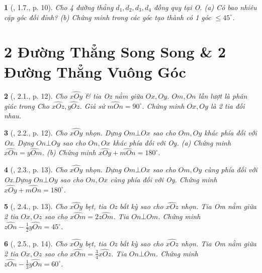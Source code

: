 \documentclass{article}
\newtheorem{baitoan}{}
\begin{document}
\begin{baitoan}[\cite{Hung_Mai_Toan_7_hinh_hoc}, 1.7., p. 10]
	Cho 4 đường thẳng $d_1,d_2,d_3,d_4$ đồng quy tại O. (a) Có bao nhiêu cặp góc đối đỉnh? (b) Chứng minh trong các góc tạo thành có 1 góc $\le45^\circ$.
\end{baitoan}


\section{2 Đường Thẳng Song Song \& 2 Đường Thẳng Vuông Góc}

\begin{baitoan}[\cite{Hung_Mai_Toan_7_hinh_hoc}, 2.1., p. 12]
	Cho $\widehat{xOy}$ \& tia Oz nằm giữa $Ox,Oy$. $Om,On$ lần lượt là phân giác trong Cho $\widehat{xOz},\widehat{yOz}$. Giả sử $\widehat{mOn} = 90^\circ$. Chứng minh $Ox,Oy$ là 2 tia đối nhau.
\end{baitoan}

\begin{baitoan}[\cite{Hung_Mai_Toan_7_hinh_hoc}, 2.2., p. 12]
	Cho $\widehat{xOy}$ nhọn. Dựng $Om\bot Ox$ sao cho $Om,Oy$ khác phía đối với Ox. Dựng $On\bot Oy$ sao cho $On,Ox$ khác phía đối với Oy. (a) Chứng minh $\widehat{xOn} = \widehat{yOm}$. (b) Chứng minh $\widehat{xOy} + \widehat{mOn} = 180^\circ$.
\end{baitoan}

\begin{baitoan}[\cite{Hung_Mai_Toan_7_hinh_hoc}, 2.3., p. 13]
	Cho $\widehat{xOy}$ nhọn. Dựng $Om\bot Ox$ sao cho $Om,Oy$ cùng phía đối với Ox.Dựng $On\bot Oy$ sao cho $On,Ox$ cùng phía đối với Oy. Chứng minh $\widehat{xOy} + \widehat{mOn} = 180^\circ$.
\end{baitoan}

\begin{baitoan}[\cite{Hung_Mai_Toan_7_hinh_hoc}, 2.4., p. 13]
	Cho $\widehat{xOy}$ bẹt, tia Oz bất kỳ sao cho $\widehat{xOz}$ nhọn. Tia Om nằm giữa 2 tia $Ox,Oz$ sao cho $\widehat{xOm} = 2\widehat{zOm}$. Tia $On\bot Om$. Chứng minh $\widehat{zOn} - \frac{1}{2}\widehat{yOn} = 45^\circ$.
\end{baitoan}

\begin{baitoan}[\cite{Hung_Mai_Toan_7_hinh_hoc}, 2.5., p. 14]
	Cho $\widehat{xOy}$ bẹt, tia Oz bất kỳ sao cho $\widehat{xOz}$ nhọn. Tia Om nằm giữa 2 tia $Ox,Oz$ sao cho $\widehat{xOm} = \frac{3}{4}\widehat{xOz}$. Tia $On\bot Om$. Chứng minh $\widehat{zOn} - \frac{1}{3}\widehat{yOn} = 60^\circ$.
\end{baitoan}
\end{document}

